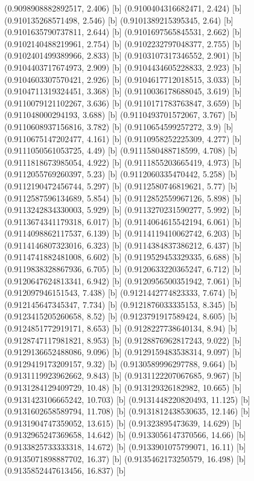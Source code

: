 {{{(0.9098908882892517, 2.406) [b] 
(0.9100404316682471, 2.424) [b] 
(0.910135268571498, 2.546) [b] 
(0.9101389215395345, 2.64) [b] 
(0.9101635790737811, 2.644) [b] 
(0.9101697565845531, 2.662) [b] 
(0.9102140488219961, 2.754) [b] 
(0.9102232797048377, 2.755) [b] 
(0.9102401499389966, 2.833) [b] 
(0.9103107317346552, 2.901) [b] 
(0.9104403717674973, 2.909) [b] 
(0.9104434605228833, 2.923) [b] 
(0.9104603307570421, 2.926) [b] 
(0.9104617712018515, 3.033) [b] 
(0.9104711319324451, 3.368) [b] 
(0.9110036178688045, 3.619) [b] 
(0.9110079121102267, 3.636) [b] 
(0.9110171783763847, 3.659) [b] 
(0.911048000294193, 3.688) [b] 
(0.9110493701572067, 3.767) [b] 
(0.9110608937156816, 3.782) [b] 
(0.9110654599257272, 3.9) [b] 
(0.9110675147202477, 4.161) [b] 
(0.9110958252225309, 4.277) [b] 
(0.9111050561053725, 4.49) [b] 
(0.9111580488718599, 4.708) [b] 
(0.9111818673985054, 4.922) [b] 
(0.9111855203665419, 4.973) [b] 
(0.9112055769260397, 5.23) [b] 
(0.9112060335470442, 5.258) [b] 
(0.9112190472456744, 5.297) [b] 
(0.9112580746819621, 5.77) [b] 
(0.9112587596134689, 5.854) [b] 
(0.9112852559967126, 5.898) [b] 
(0.9113242834330003, 5.929) [b] 
(0.9113270231590277, 5.992) [b] 
(0.9113674341179318, 6.017) [b] 
(0.9114064615542194, 6.061) [b] 
(0.9114098862117537, 6.139) [b] 
(0.9114119410062742, 6.203) [b] 
(0.9114146807323016, 6.323) [b] 
(0.9114384837386212, 6.437) [b] 
(0.9114741882481008, 6.602) [b] 
(0.9119529453329335, 6.688) [b] 
(0.9119838328867936, 6.705) [b] 
(0.9120633220365247, 6.712) [b] 
(0.9120647624813341, 6.942) [b] 
(0.9120956500351942, 7.061) [b] 
(0.912097946151543, 7.438) [b] 
(0.9121442774823333, 7.674) [b] 
(0.912145647345347, 7.734) [b] 
(0.9121876033335153, 8.345) [b] 
(0.9123415205260658, 8.52) [b] 
(0.9123791917589424, 8.605) [b] 
(0.9124851772919171, 8.653) [b] 
(0.9128227738640134, 8.94) [b] 
(0.9128747117981821, 8.953) [b] 
(0.9128876962817243, 9.022) [b] 
(0.9129136652488086, 9.096) [b] 
(0.9129159483538314, 9.097) [b] 
(0.9129419173209157, 9.32) [b] 
(0.9130589996297788, 9.664) [b] 
(0.9131119923962662, 9.843) [b] 
(0.9131122207067685, 9.967) [b] 
(0.9131284129409729, 10.48) [b] 
(0.913129326182982, 10.665) [b] 
(0.9131423106665242, 10.703) [b] 
(0.9131448220820493, 11.125) [b] 
(0.9131602658589794, 11.708) [b] 
(0.9131812438530635, 12.146) [b] 
(0.9131904747359052, 13.615) [b] 
(0.91323895473639, 14.629) [b] 
(0.9132965247369658, 14.642) [b] 
(0.9133056147370566, 14.66) [b] 
(0.9133825733333318, 14.672) [b] 
(0.9133901075799071, 16.11) [b] 
(0.9135071898887702, 16.37) [b] 
(0.9135462173250579, 16.498) [b] 
(0.9135852447613456, 16.837) [b] 
}}}
